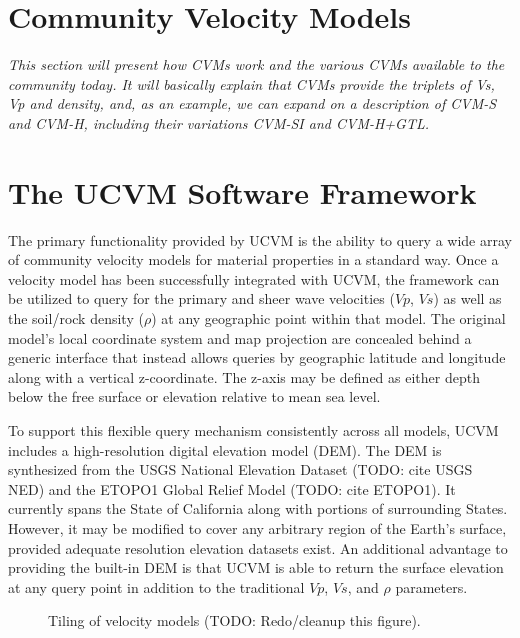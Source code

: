 


\section{Community Velocity Models}
\label{sec:cvms}

\textit{
\color{blue}
This section will present how CVMs work and the various CVMs available to the community today. It will basically explain that CVMs provide the triplets of Vs, Vp and density, and, as an example, we can expand on a description of CVM-S and CVM-H, including their variations CVM-SI and CVM-H+GTL.
}

\section{The UCVM Software Framework}\label{sec:ucvm}
The primary functionality provided by UCVM is the ability to query a wide array of community velocity models for material properties in a standard way. Once a velocity model has been successfully integrated with UCVM, the framework can be utilized to query for the primary and sheer wave velocities ($Vp$, $Vs$) as well as the soil/rock density ($\rho$) at any geographic point within that model. The original model's local coordinate system and map projection are concealed behind a generic interface that instead allows queries by geographic latitude and longitude along with a vertical z-coordinate. The z-axis may be defined as either depth below the free surface or elevation relative to mean sea level.

To support this flexible query mechanism consistently across all models, UCVM includes a high-resolution digital elevation model (DEM). The DEM is synthesized from the USGS National Elevation Dataset (TODO: cite USGS NED) and the ETOPO1 Global Relief Model (TODO: cite ETOPO1). It currently spans the State of California along with portions of surrounding States. However, it may be modified to cover any arbitrary region of the Earth's surface, provided adequate resolution elevation datasets exist. An additional advantage to providing the built-in DEM is that UCVM is able to return the surface elevation at any query point in addition to the traditional $Vp$, $Vs$, and $\rho$ parameters.
\begin{figure}
\centering
{}
\caption{Tiling of velocity models (TODO: Redo/cleanup this figure).}\label{fig:tiling}
\end{figure}

